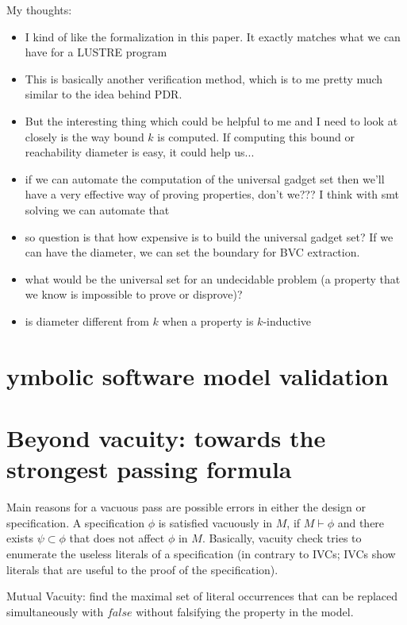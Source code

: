 \linebreak
\linebreak
My thoughts:
\begin{itemize}
  \item I kind of like the formalization in this paper. It exactly matches what we can have for a LUSTRE program
  \item This is basically another verification method, which is to me pretty much similar to the idea behind PDR.
  \item But the interesting thing which could be helpful to me and I need to look at closely is
  the way bound $k$ is computed. If computing this bound or reachability diameter is easy, it could help us...
  \item if we can automate the computation of the universal gadget set then we'll have a very effective way of proving properties, don't we??? I think with smt solving we can automate that
  \item so question is that how expensive is to build the universal gadget set? If we can have the diameter, we can set the boundary for BVC extraction. 
  \item what would be the universal set for an undecidable problem (a property that we know is impossible to prove or disprove)?
  \item is diameter different from $k$ when a property is $k$-inductive

\end{itemize}


\section {ymbolic software model validation \cite{sturton2013symbolic}}



\section{Beyond vacuity: towards the strongest passing formula \cite{chockler2013beyond}}
Main reasons for a vacuous pass are possible errors in either the design or specification.
A specification $\phi$ is satisfied vacuously in $M$, if $M \vdash \phi$ and
there exists $\psi \subset \phi$ that does not affect $\phi$ in $M$.
Basically, vacuity check tries to
enumerate the useless literals of a specification (in contrary to IVCs;
IVCs show literals that are useful to the proof of the specification).

Mutual Vacuity: find the maximal set of literal occurrences that can be
replaced simultaneously with $false$ without falsifying the property in the model.

